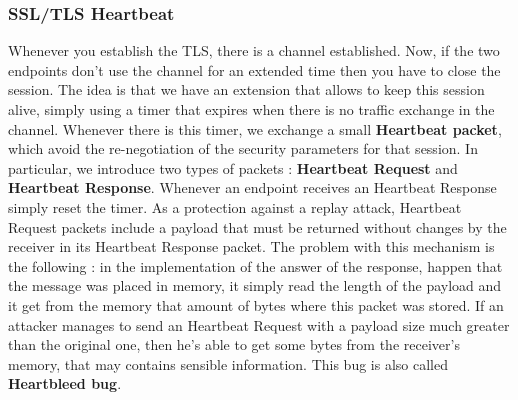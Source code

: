 \documentclass[11pt]{article}
\begin{document}
\subsubsection{SSL/TLS Heartbeat}
Whenever you establish the TLS, there is a channel established. Now, if the two endpoints don't use the channel for an extended time then you have to close the session. The idea is that we have an extension that allows to keep this session alive, simply using a timer that expires when there is no traffic exchange in the channel. Whenever there is this timer, we exchange a small \textbf{Heartbeat packet}, which avoid the re-negotiation of the security parameters for that session. In particular, we introduce two types of packets : \textbf{Heartbeat Request} and \textbf{Heartbeat Response}. Whenever an endpoint receives an Heartbeat Response simply reset the timer. As a protection against a replay attack, Heartbeat Request packets include a payload that must be returned without changes by the receiver in its Heartbeat Response packet.  The problem with this mechanism is the following : in the implementation of the answer of the response, happen that the message was placed in memory, it simply read the length of the payload and it get from the memory that amount of bytes where this packet was stored. If an attacker manages to send an Heartbeat Request with a payload size much greater than the original one, then he's able to get some bytes from the receiver's memory, that may contains sensible information. This bug is also called \textbf{Heartbleed bug}.
\end{document}
